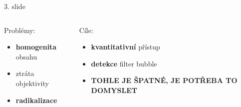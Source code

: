 \documentclass[notheorems,12pt]{beamer}
\begin{document}
\begin{frame}{3. slide}
    \begin{columns}
    \column{5cm}
        \begin{block}{Problémy:}
            \begin{itemize}
                \item \textbf{homogenita} obsahu
                \item ztráta objektivity
                \item \textbf{radikalizace}
            \end{itemize}
        \end{block}
    \column{6cm}
    \begin{block}{Cíle:}
        \begin{itemize}
            \item \textbf{kvantitativní} přístup
            \item \textbf{detekce} filter bubble
            \item \textbf{TOHLE JE ŠPATNÉ, JE POTŘEBA TO DOMYSLET}
        \end{itemize}
    \end{block}
    \end{columns}
\end{frame}
\end{document}
